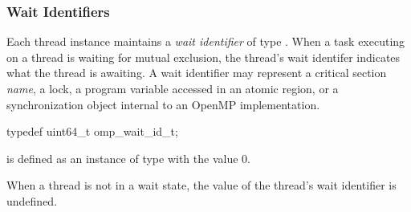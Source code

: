 \subsubsection{Wait Identifiers}

\label{sec:omp_wait_id_t}

Each thread instance maintains a \emph{wait identifier} of type .
When a task executing on a thread is waiting for mutual exclusion, the thread's wait identifer indicates what the thread is awaiting.
A wait identifier may represent a critical section {\em name}, a lock, a program variable accessed in an atomic region, or a synchronization object internal to an OpenMP implementation.


\begin{ccppspecific}
\begin{omptOther}
typedef uint64_t omp_wait_id_t;
\end{omptOther}
\end{ccppspecific}

 is defined as an instance of type  with the 
value 0.


When a thread is not in a wait state, the value of the thread's wait identifier is undefined.


